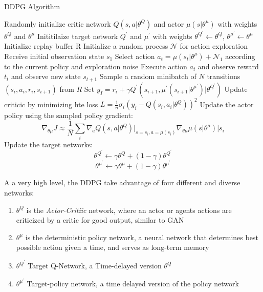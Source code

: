 \documentclass[doc, onecolumn, 12pt]{apa6}
\begin{document}
\begin{algorithm}[H]
\caption{DDPG Algorithm \citep{DDPG}}
\begin{algorithmic}[1]
\State Randomly initialize critic network $Q(s, a \vert \theta^{Q})$ and actor $\mu(s \vert \theta^{\mu})$ with weights $\theta^{Q}$ and $\theta^{\mu}$
\State Inititilaize target network $Q^{\prime}$ and $\mu^{\prime}$ with weights $\theta^{Q^{\prime}} \leftarrow \theta^{Q}$, $\theta^{\mu^{\prime}} \leftarrow \theta^{\mu}$
\State Initialize replay buffer R
	\State Initialize  a random process $\mathcal{N}$ for action exploration 
	\State Receive initial observation state $s_{1}$
		\State Select action $a_{t}= \mu(s_{t} \vert \theta^{\mu}) + \mathcal{N}_{1}$ according to the current policy and exploration noise
		\State Execute action $a_{t}$ and observe reward $t_{t}$ and observe new state $s_{t+1}$ 
		\State Sample a random minibatch of $N$ transitions $(s_{i}, a_{i}, r_{i}, s_{i+1})$ from $R$
		\State Set $y_{I} = r_{i} + \gamma Q^{\prime}(s_{i+1}, \mu^{\prime}(s_{i+1} \vert \theta^{\mu^{\prime}} ) \vert \theta^{Q^{\prime}})$
		\State Update criticic by minimizing hte loss $L= \frac{1}{n}\sigma_{i}(y_{i}-Q(s_{i},a_{i} \vert \theta^{Q}))^{2}$
		\State Update the actor policy using the sampled policy gradient: \[ \nabla_{\theta \mu} J \approx \frac{1}{N} \sum_{i} \nabla_{a} Q(s, a \vert \theta^{Q}) \vert_{s=s_{i}, a = \mu (s_{i})}  \nabla_{\theta\mu} \mu(s \vert \theta ^{\mu}) \vert s_{i} \]
		\State Update the target networks: 
			\[\theta^{Q^{\prime}} \leftarrow \gamma\theta^{Q} + (1- \gamma)\theta^{Q^{\prime}} \] 
			\[ 			\theta^{\mu^{\prime}} \leftarrow \gamma\theta^{\mu} + (1- \gamma)\theta^{\mu^{\prime}}  \]
	\EndFor
\EndFor
\end{algorithmic}
\end{algorithm}


A a very high level, the  DDPG take advantage of four different and diverse networks: \begin{enumerate}
\item $\theta^{Q}$  is the \emph{Actor-Critiic} network, where an actor or agents actions are criticized by a critic for good output, similar to GAN
\item $\theta^{\mu}$ is the deterministic policy network, a neural network that determines best possible action given a time, and serves as long-term memory
\item $\theta^{Q^{\prime}}$ Target Q-Network, a Time-delayed version $\theta^{Q}$
\item $\theta^{\mu^{\prime}}$ Target-policy network, a time delayed version of the policy network
\end{enumerate} 
\end{document}
